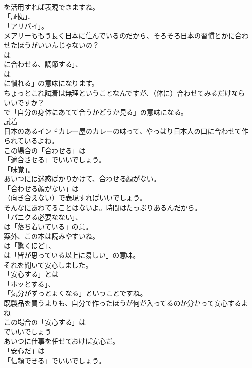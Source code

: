 \documentclass[8pt]{extreport}
\begin{document}
\begin{CJK}{UTF8}{min}
\\	を活用すれば表現できますね。
\\	「証拠」、
\\	「アリバイ」。	
\\	メアリーももう長く日本に住んでいるのだから、そろそろ日本の習慣とかに合わせたほうがいいんじゃないの？ 
\\	は
\\	に合わせる、調節する」、
\\	は
\\	に慣れる」の意味になります。	
\\	ちょっとこれ試着は無理ということなんですが、（体に）合わせてみるだけならいいですか？ 
\\	で「自分の身体にあてて合うかどうか見る」の意味になる。	
\\	試着
\\	日本のあるインドカレー屋のカレーの味って、やっぱり日本人の口に合わせて作られているよね。 
\\	この場合の「合わせる」は
\\	「適合させる」でいいでしょう。
\\	「味覚」。	
\\	あいつには迷惑ばかりかけて、合わせる顔がない。 
\\	「合わせる顔がない」は
\\	（向き合えない）で表現すればいいでしょう。	
\\	そんなにあわてることはないよ。時間はたっぷりあるんだから。 
\\	「パニクる必要なない」、
\\	は「落ち着いている」の意。	
\\	案外、この本は読みやすいね。 
\\	は「驚くほど」、
\\	は「皆が思っている以上に易しい」の意味。	
\\	それを聞いて安心しました。 
\\	「安心する」とは
\\	「ホッとする」、
\\	「気分がずっとよくなる」ということですね。	
\\	既製品を買うよりも、自分で作ったほうが何が入ってるのか分かって安心するよね 
\\	この場合の「安心する」は
\\	でいいでしょう	
\\	あいつに仕事を任せておけば安心だ。 
\\	「安心だ」は
\\	「信頼できる」でいいでしょう。

\end{CJK}
\end{document}
